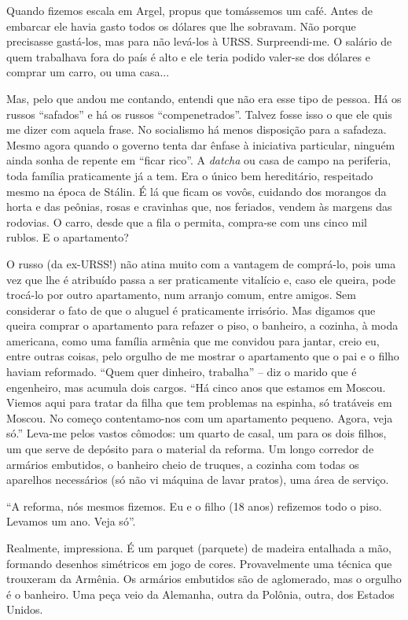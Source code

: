 Quando fizemos escala em Argel, propus que tomássemos um café. Antes de
embarcar ele havia gasto todos os dólares que lhe sobravam. Não porque
precisasse gastá-los, mas para não levá-los à URSS. Surpreendi-me. O
salário de quem trabalhava fora do país é alto e ele teria podido
valer-se dos dólares e comprar um carro, ou uma casa...

Mas, pelo que andou me contando, entendi que não era esse tipo de
pessoa. Há os russos ``safados'' e há os russos ``compenetrados''.
Talvez fosse isso o que ele quis me dizer com aquela frase. No
socialismo há menos disposição para a safadeza. Mesmo agora quando o
governo tenta dar ênfase à iniciativa particular, ninguém ainda sonha de
repente em ``ficar rico''. A \emph{datcha} ou casa de campo na
periferia, toda família praticamente já a tem. Era o único bem
hereditário, respeitado mesmo na época de Stálin. É lá que ficam os
vovôs, cuidando dos morangos da horta e das peônias, rosas e cravinhas
que, nos feriados, vendem às margens das rodovias. O carro, desde que a
fila o permita, compra-se com uns cinco mil rublos. E o apartamento?

O russo (da ex-URSS!) não atina muito com a vantagem de comprá-lo, pois
uma vez que lhe é atribuído passa a ser praticamente vitalício e, caso
ele queira, pode trocá-lo por outro apartamento, num arranjo comum,
entre amigos. Sem considerar o fato de que o aluguel é praticamente
irrisório. Mas digamos que queira comprar o apartamento para refazer o
piso, o banheiro, a cozinha, à moda americana, como uma família armênia
que me convidou para jantar, creio eu, entre outras coisas, pelo orgulho
de me mostrar o apartamento que o pai e o filho haviam reformado. ``Quem
quer dinheiro, trabalha'' -- diz o marido que é engenheiro, mas acumula
dois cargos. ``Há cinco anos que estamos em Moscou. Viemos aqui para
tratar da filha que tem problemas na espinha, só tratáveis em Moscou. No
começo contentamo-nos com um apartamento pequeno. Agora, veja só.''
Leva-me pelos vastos cômodos: um quarto de casal, um para os dois
filhos, um que serve de depósito para o material da reforma. Um longo
corredor de armários embutidos, o banheiro cheio de truques, a cozinha
com todas os aparelhos necessários (só não vi máquina de lavar pratos),
uma área de serviço.

``A reforma, nós mesmos fizemos. Eu e o filho (18 anos) refizemos todo o
piso. Levamos um ano. Veja só''.

Realmente, impressiona. É um parquet (parquete) de madeira entalhada a
mão, formando desenhos simétricos em jogo de cores. Provavelmente uma
técnica que trouxeram da Armênia. Os armários embutidos são de
aglomerado, mas o orgulho é o banheiro. Uma peça veio da Alemanha, outra
da Polônia, outra, dos Estados Unidos.

